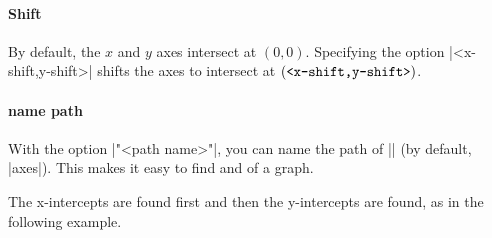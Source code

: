 \begin{tzcode}{.3}
\end{tzcode}


\paragraph{Shift}
By default, the $x$ and $y$ axes intersect at $(0,0)$.
Specifying the option |<x-shift,y-shift>| shifts the axes to intersect at $(\text{\ttfamily<x-shift,y-shift>})$.

\begin{tzcode}{.3}
\end{tzcode}


\begin{tzcode}{.3}
\end{tzcode}

\paragraph{name path}
With the option |"<path name>"|, you can name the path of |\tzaxes| (by default, |axes|). 
This makes it easy to find  and  of a graph.

\begin{tzcode}{.3}
\end{tzcode}

The x-intercepts are found first and then the y-intercepts are found, as in the following example.

\begin{tzcode}{.3}
\end{tzcode}

